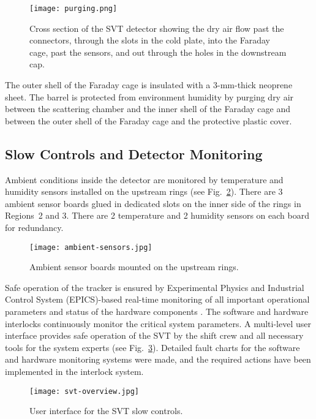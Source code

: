 \begin{figure}[hbt] 
\centering 
\texttt{[image: purging.png]}
\caption{Cross section of the SVT detector showing the dry air flow past the connectors, through the slots in the
  cold plate, into the Faraday cage, past the sensors, and out through the holes in the downstream cap.}
\label{fig:purging}
\end{figure}

The outer shell of the Faraday cage is insulated with a 3-mm-thick neoprene sheet. The barrel is protected from
environment humidity by purging dry air between the scattering chamber and the inner shell of the Faraday cage
and between the outer shell of the Faraday cage and the protective plastic cover. 

\subsection{Slow Controls and Detector Monitoring}

Ambient conditions inside the detector are monitored by temperature and humidity sensors installed on the
upstream rings (see Fig.~\ref{fig:ambient-sensors}). There are 3 ambient sensor boards glued in dedicated slots
on the inner side of the rings in Regions~2 and 3. There are 2 temperature and 2 humidity sensors on each board
for redundancy. 

\begin{figure}[hbt] 
\centering 
\texttt{[image: ambient-sensors.jpg]}
\caption{Ambient sensor boards mounted on the upstream rings.}
\label{fig:ambient-sensors}
\end{figure}

Safe operation of the tracker is ensured by Experimental Physics and Industrial Control System (EPICS)-based
real-time monitoring of all important operational parameters and status of the hardware components \cite{EPICS}.
The software and hardware interlocks continuously monitor the critical system parameters. A multi-level user
interface provides safe operation of the SVT by the shift crew and all necessary tools for the system experts (see
Fig.~\ref{fig:svt-overview}). Detailed fault charts for the software and hardware monitoring systems were made,
and the required actions have been implemented in the interlock system.

\begin{figure}[hbt] 
\centering 
\texttt{[image: svt-overview.jpg]}
\caption{User interface for the SVT slow controls.}
\label{fig:svt-overview}
\end{figure}

